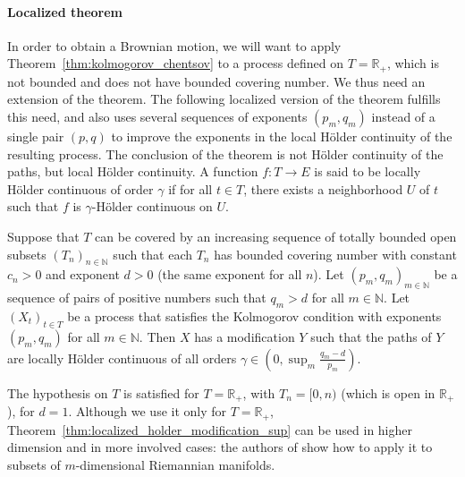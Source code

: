 \documentclass[lean]{Draft}
\makeatletter
\newcommand\leanlink{\begingroup\catcode`\#=12\relax\@leanlink}
\newcommand\@leanlink[2]{\endgroup
\href{#1}
{\texttt{\detokenize{#2}}}}
\newcommand{\docs}[1]{%
\leanlink{https://remydegenne.github.io/brownian-motion/docs/find/?pattern=#1\#doc}
{#1}}
\makeatother
\begin{document}



\paragraph{Localized theorem}

In order to obtain a Brownian motion, we will want to apply Theorem~\ref{thm:kolmogorov_chentsov} to a process defined on $T = \mathbb{R}_+$, which is not bounded and does not have bounded covering number.
We thus need an extension of the theorem.
The following localized version of the theorem fulfills this need, and also uses several sequences of exponents $(p_m, q_m)$ instead of a single pair $(p, q)$ to improve the exponents in the local Hölder continuity of the resulting process.
The conclusion of the theorem is not Hölder continuity of the paths, but local Hölder continuity.
A function $f : T \to E$ is said to be locally Hölder continuous of order $\gamma$ if for all $t \in T$, there exists a neighborhood $U$ of $t$ such that $f$ is $\gamma$-Hölder continuous on $U$.

\begin{theorem}[\docs{ProbabilityTheory.exists_modification_holder_iSup}]\label{thm:localized_holder_modification_sup}
Suppose that $T$ can be covered by an increasing sequence of totally bounded open subsets $(T_n)_{n \in \mathbb{N}}$ such that each $T_n$ has bounded covering number with constant $c_n > 0$ and exponent $d > 0$ (the same exponent for all $n$).
Let $(p_m, q_m)_{m \in \mathbb{N}}$ be a sequence of pairs of positive numbers such that $q_m > d$ for all $m \in \mathbb{N}$.
Let $(X_t)_{t \in T}$ be a process that satisfies the Kolmogorov condition with exponents $(p_m, q_m)$ for all $m \in \mathbb{N}$.
Then $X$ has a modification $Y$ such that the paths of $Y$ are locally Hölder continuous of all orders $\gamma \in \left(0, \sup_m \frac{q_m - d}{p_m}\right)$.
\end{theorem}

The hypothesis on $T$ is satisfied for $T = \mathbb{R}_+$, with $T_n = [0,n)$ (which is open in $\mathbb{R}_+$), for $d = 1$.
Although we use it only for $T = \mathbb{R}_+$, Theorem~\ref{thm:localized_holder_modification_sup} can be used in higher dimension and in more involved cases: the authors of \cite{kratschmer2023kolmogorov} show how to apply it to subsets of $m$-dimensional Riemannian manifolds.
\end{document}
